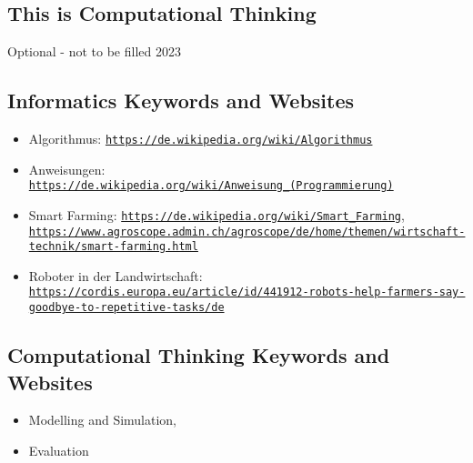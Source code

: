 \documentclass[a4paper,11pt]{report}
\newcommand{\BrochureUrlText}[1]{\texttt{#1}}
\begin{document}
\subsection*{This is Computational Thinking}

Optional - not to be filled 2023


\subsection*{Informatics Keywords and Websites}

\begin{itemize}
  \item Algorithmus: \href{https://de.wikipedia.org/wiki/Algorithmus}{\BrochureUrlText{https://de.wikipedia.org/wiki/Algorithmus}}
  \item Anweisungen: \href{https://de.wikipedia.org/wiki/Anweisung_(Programmierung)}{\BrochureUrlText{https://de.wikipedia.org/wiki/Anweisung\_(Programmierung)}}
  \item Smart Farming: \href{https://de.wikipedia.org/wiki/Smart_Farming}{\BrochureUrlText{https://de.wikipedia.org/wiki/Smart\_Farming}}, \href{https://www.agroscope.admin.ch/agroscope/de/home/themen/wirtschaft-technik/smart-farming.html}{\BrochureUrlText{https://www.agroscope.admin.ch/agroscope/de/home/themen/wirtschaft-technik/smart-farming.html}}
  \item Roboter in der Landwirtschaft: \href{https://cordis.europa.eu/article/id/441912-robots-help-farmers-say-goodbye-to-repetitive-tasks/de}{\BrochureUrlText{https://cordis.europa.eu/article/id/441912-robots-help-farmers-say-goodbye-to-repetitive-tasks/de}}
\end{itemize}


\subsection*{Computational Thinking Keywords and Websites}

\begin{itemize}
  \item Modelling and Simulation,
  \item Evaluation
\end{itemize}
\end{document}
